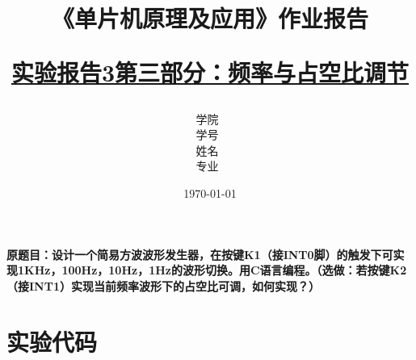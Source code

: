 \documentclass[12pt,hyperref,a4paper,UTF8]{ctexart}
\title{ 
        \vspace{1cm}
        \heiti \Huge \textbf{《单片机原理及应用》作业报告} \par
        \vspace{1cm} 
        \heiti \Large {\underline{实验报告3第三部分：频率与占空比调节}   } 
        \vspace{3cm}
    
    }
\author{
        \vspace{0.5cm}
        \kaishu\Large 学院\ \dlmu[9cm]{卓越学院} \\ %
        \vspace{0.5cm}
        \kaishu\Large 学号\ \dlmu[9cm]{23040447} \\ %
        \vspace{0.5cm}
        \kaishu\Large 姓名\ \dlmu[9cm]{陈文轩} \qquad  \\ %
        \vspace{0.5cm}
        \kaishu\Large 专业\ \dlmu[9cm]{智能硬件与系统(电子信息工程)} \qquad \\ %
    }
\date{\today} %
\begin{document}
\cover
\thispagestyle{empty} %







\newpage
\setcounter{page}{1} %



\textbf{原题目：设计一个简易方波波形发生器，在按键K1（接INT0脚）的触发下可实现1KHz，100Hz，10Hz，1Hz的波形切换。用C语言编程。（选做：若按键K2（接INT1）实现当前频率波形下的占空比可调，如何实现？）}


\section{实验代码}
\end{document}
